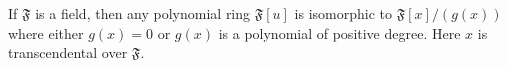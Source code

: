 If $\mathfrak{F}$ is a field, then any polynomial ring $\mathfrak{F}[u]$ is isomorphic to $\mathfrak{F}[x]/(g(x))$ where either $g(x) = 0$ or $g(x)$ is a polynomial of positive degree. Here $x$ is transcendental over $\mathfrak{F}$.
